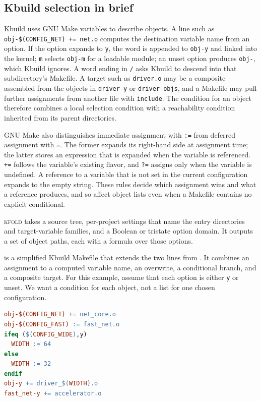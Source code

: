 \documentclass[acmsmall,screen,review]{acmart}
\newcommand{\tool}{\textsc{kfold}\xspace}
\begin{document}
\subsection{Kbuild selection in brief}
Kbuild uses GNU Make variables to describe objects. A line such as \texttt{obj-\$(CONFIG\_NET) += net.o} computes the destination variable name from an option. If the option expands to \texttt{y}, the word is appended to \texttt{obj-y} and linked into the kernel; \texttt{m} selects \texttt{obj-m} for a loadable module; an unset option produces \texttt{obj-}, which Kbuild ignores. A word ending in \texttt{/} asks Kbuild to descend into that subdirectory's Makefile. A target such as \texttt{driver.o} may be a composite assembled from the objects in \texttt{driver-y} or \texttt{driver-objs}, and a Makefile may pull further assignments from another file with \texttt{include}. The condition for an object therefore combines a local selection condition with a reachability condition inherited from its parent directories.

GNU Make also distinguishes immediate assignment with \texttt{:=} from deferred assignment with \texttt{=}. The former expands its right-hand side at assignment time; the latter stores an expression that is expanded when the variable is referenced. \texttt{+=} follows the variable's existing flavor, and \texttt{?=} assigns only when the variable is undefined. A reference to a variable that is not set in the current configuration expands to the empty string. These rules decide which assignment wins and what a reference produces, and so affect object lists even when a Makefile contains no explicit conditional.

\tool takes a source tree, per-project settings that name the entry directories and target-variable families, and a Boolean or tristate option domain. It outputs a set of object paths, each with a formula over those options.

 is a simplified Kbuild Makefile that extends the two lines from . It combines an assignment to a computed variable name, an overwrite, a conditional branch, and a composite target. For this example, assume that each option is either \texttt{y} or unset. We want a condition for each object, not a list for one chosen configuration.

\begin{lstlisting}[language=make,float=t,caption={Simplified Kbuild Makefile. Each object's final condition also includes the guard under which this directory is entered.},label={lst:example}]
obj-$(CONFIG_NET) += net_core.o
obj-$(CONFIG_FAST) := fast_net.o
ifeq ($(CONFIG_WIDE),y)
  WIDTH := 64
else
  WIDTH := 32
endif
obj-y += driver_$(WIDTH).o
fast_net-y += accelerator.o
\end{lstlisting}
\end{document}
